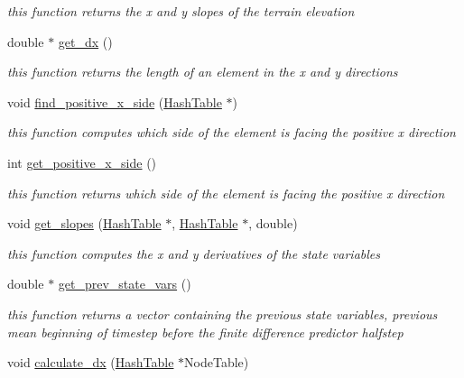 \begin{CompactItemize}
\begin{CompactList}\small\item\em this function returns the x and y slopes of the terrain elevation \item\end{CompactList}\item 
double $\ast$ \hyperlink{classElement_a68}{get\_\-dx} ()
\begin{CompactList}\small\item\em this function returns the length of an element in the x and y directions \item\end{CompactList}\item 
void \hyperlink{classElement_a69}{find\_\-positive\_\-x\_\-side} (\hyperlink{classHashTable}{Hash\-Table} $\ast$)
\begin{CompactList}\small\item\em this function computes which side of the element is facing the positive x direction \item\end{CompactList}\item 
int \hyperlink{classElement_a70}{get\_\-positive\_\-x\_\-side} ()
\begin{CompactList}\small\item\em this function returns which side of the element is facing the positive x direction \item\end{CompactList}\item 
void \hyperlink{classElement_a71}{get\_\-slopes} (\hyperlink{classHashTable}{Hash\-Table} $\ast$, \hyperlink{classHashTable}{Hash\-Table} $\ast$, double)
\begin{CompactList}\small\item\em this function computes the x and y derivatives of the state variables \item\end{CompactList}\item 
double $\ast$ \hyperlink{classElement_a72}{get\_\-prev\_\-state\_\-vars} ()
\begin{CompactList}\small\item\em this function returns a vector containing the previous state variables, previous mean beginning of timestep before the finite difference predictor halfstep \item\end{CompactList}\item 
void \hyperlink{classElement_a73}{calculate\_\-dx} (\hyperlink{classHashTable}{Hash\-Table} $\ast$Node\-Table)

\end{CompactItemize}
